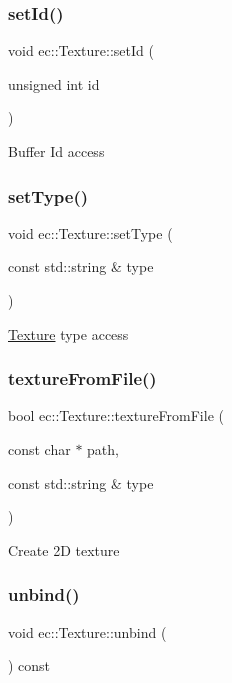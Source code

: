 \subsubsection{\texorpdfstring{set\+Id()}{setId()}}
{\footnotesize\ttfamily void ec\+::\+Texture\+::set\+Id (\begin{DoxyParamCaption}\item[{unsigned int}]{id }\end{DoxyParamCaption})}

Buffer Id access \mbox{\label{classec_1_1_texture_a4d984f43478753facd81186d1cd36bcb}} 
\subsubsection{\texorpdfstring{set\+Type()}{setType()}}
{\footnotesize\ttfamily void ec\+::\+Texture\+::set\+Type (\begin{DoxyParamCaption}\item[{const std\+::string \&}]{type }\end{DoxyParamCaption})}

\mbox{\hyperlink{classec_1_1_texture}{Texture}} type access \mbox{\label{classec_1_1_texture_ac2461a696b914d1b22192a87d326f480}} 
\subsubsection{\texorpdfstring{texture\+From\+File()}{textureFromFile()}}
{\footnotesize\ttfamily bool ec\+::\+Texture\+::texture\+From\+File (\begin{DoxyParamCaption}\item[{const char $\ast$}]{path,  }\item[{const std\+::string \&}]{type }\end{DoxyParamCaption})}

Create 2D texture \mbox{\label{classec_1_1_texture_a95c72abc5c801df231fc970c6adffdcc}} 
\subsubsection{\texorpdfstring{unbind()}{unbind()}}
{\footnotesize\ttfamily void ec\+::\+Texture\+::unbind (\begin{DoxyParamCaption}{ }\end{DoxyParamCaption}) const}

